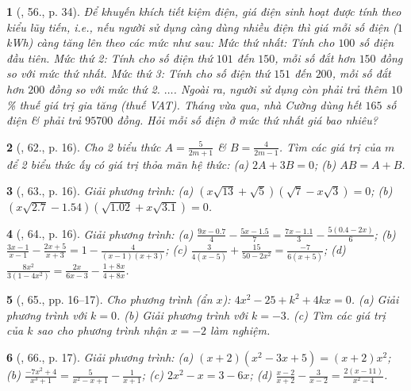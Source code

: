 \documentclass{article}
\newtheorem{baitoan}{}
\begin{document}
\begin{baitoan}[\cite{SGK_Toan_8_tap_2}, 56., p. 34]
	Để khuyến khích tiết kiệm điện, giá điện sinh hoạt được tính theo kiểu lũy tiến, i.e., nếu người sử dụng càng dùng nhiều điện thì giá mỗi số điện ($1$kWh) càng tăng lên theo các mức như sau: Mức thứ nhất: Tính cho $100$ số điện đầu tiên. Mức thứ 2: Tính cho số điện thứ $101$ đến $150$, mỗi số đắt hơn $150$ đồng so với mức thứ nhất. Mức thứ 3: Tính cho số điện thứ $151$ đến $200$, mỗi số đắt hơn $200$ đồng so với mức thứ 2. $\ldots$. Ngoài ra, người sử dụng còn phải trả thêm $10$\% thuế giá trị gia tăng (thuế VAT). Tháng vừa qua, nhà Cường dùng hết $165$ số điện \& phải trả $95700$ đồng. Hỏi mỗi số điện ở mức thứ nhất giá bao nhiêu?
\end{baitoan}

\begin{baitoan}[\cite{SBT_Toan_8_tap_2}, 62., p. 16]
	Cho 2 biểu thức $A = \frac{5}{2m + 1}$ \& $B = \frac{4}{2m - 1}$. Tìm các giá trị của $m$ để 2 biểu thức ấy có giá trị thỏa mãn hệ thức: (a) $2A + 3B = 0$; (b) $AB = A + B$.
\end{baitoan}

\begin{baitoan}[\cite{SBT_Toan_8_tap_2}, 63., p. 16]
	Giải phương trình: (a) $(x\sqrt{13} + \sqrt{5})(\sqrt{7} - x\sqrt{3}) = 0$; (b) $(x\sqrt{2.7} - 1.54)(\sqrt{1.02} + x\sqrt{3.1}) = 0$.
\end{baitoan}

\begin{baitoan}[\cite{SBT_Toan_8_tap_2}, 64., p. 16]
	Giải phương trình: (a) $\frac{9x - 0.7}{4} - \frac{5x - 1.5}{7} = \frac{7x - 1.1}{3} - \frac{5(0.4 - 2x)}{6}$; (b) $\frac{3x - 1}{x - 1} - \frac{2x + 5}{x + 3} = 1 - \frac{4}{(x - 1)(x + 3)}$; (c) $\frac{3}{4(x - 5)} + \frac{15}{50 - 2x^2} = \frac{-7}{6(x + 5)}$; (d) $\frac{8x^2}{3(1 - 4x^2)} = \frac{2x}{6x - 3} - \frac{1 + 8x}{4 + 8x}$.
\end{baitoan}

\begin{baitoan}[\cite{SBT_Toan_8_tap_2}, 65., pp. 16--17]
	Cho phương trình (ẩn $x$): $4x^2 - 25 + k^2 + 4kx = 0$. (a) Giải phương trình với $k = 0$. (b) Giải phương trình với $k = -3$. (c) Tìm các giá trị của $k$ sao cho phương trình nhận $x = -2$ làm nghiệm.
\end{baitoan}

\begin{baitoan}[\cite{SBT_Toan_8_tap_2}, 66., p. 17]
	Giải phương trình: (a) $(x + 2)(x^2 - 3x + 5) = (x + 2)x^2$; (b) $\frac{-7x^2 + 4}{x^3 + 1} = \frac{5}{x^2 - x + 1} - \frac{1}{x + 1}$; (c) $2x^2 - x = 3 - 6x$; (d) $\frac{x - 2}{x + 2} - \frac{3}{x - 2} = \frac{2(x - 11)}{x^2 - 4}$.
\end{baitoan}
\end{document}
